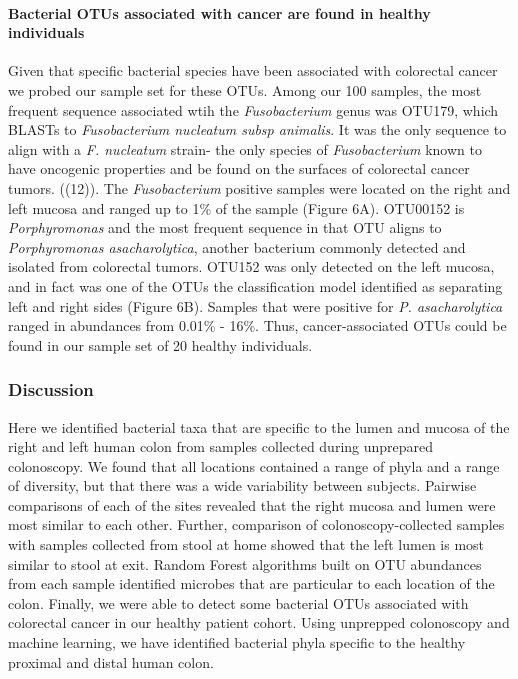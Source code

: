 \documentclass[11pt,]{article}
\let\oldparagraph\paragraph
\renewcommand{\paragraph}[1]{\oldparagraph{#1}\mbox{}}
\begin{document}
\paragraph{Bacterial OTUs associated with cancer are found in healthy
individuals}\label{bacterial-otus-associated-with-cancer-are-found-in-healthy-individuals}

Given that specific bacterial species have been associated with
colorectal cancer we probed our sample set for these OTUs. Among our 100
samples, the most frequent sequence associated wtih the
\emph{Fusobacterium} genus was OTU179, which BLASTs to
\emph{Fusobacterium nucleatum subsp animalis}. It was the only sequence
to align with a \emph{F. nucleatum} strain- the only species of
\emph{Fusobacterium} known to have oncogenic properties and be found on
the surfaces of colorectal cancer tumors. ((12)). The
\emph{Fusobacterium} positive samples were located on the right and left
mucosa and ranged up to 1\% of the sample (Figure 6A). OTU00152 is
\emph{Porphyromonas} and the most frequent sequence in that OTU aligns
to \emph{Porphyromonas asacharolytica}, another bacterium commonly
detected and isolated from colorectal tumors. OTU152 was only detected
on the left mucosa, and in fact was one of the OTUs the classification
model identified as separating left and right sides (Figure 6B). Samples
that were positive for \emph{P. asacharolytica} ranged in abundances
from 0.01\% - 16\%. Thus, cancer-associated OTUs could be found in our
sample set of 20 healthy individuals.

\subsubsection{Discussion}\label{discussion}

Here we identified bacterial taxa that are specific to the lumen and
mucosa of the right and left human colon from samples collected during
unprepared colonoscopy. We found that all locations contained a range of
phyla and a range of diversity, but that there was a wide variability
between subjects. Pairwise comparisons of each of the sites revealed
that the right mucosa and lumen were most similar to each other.
Further, comparison of colonoscopy-collected samples with samples
collected from stool at home showed that the left lumen is most similar
to stool at exit. Random Forest algorithms built on OTU abundances from
each sample identified microbes that are particular to each location of
the colon. Finally, we were able to detect some bacterial OTUs
associated with colorectal cancer in our healthy patient cohort. Using
unprepped colonoscopy and machine learning, we have identified bacterial
phyla specific to the healthy proximal and distal human colon.
\end{document}
